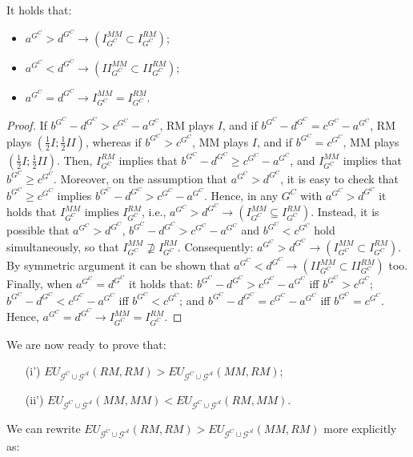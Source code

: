 \documentclass[fleqn,reqno,11pt]{article}
\begin{document}
\medskip{}

\begin{lemma}
It holds that:
\begin{itemize}
\item $a^{G^{C}}>d^{G^{C}}\rightarrow(I_{G^{C}}^{MM}\subset I_{G^{C}}^{RM})$;
\item $a^{G^{C}}<d^{G^{C}}\rightarrow(II_{G^{C}}^{MM}\subset II_{G^{C}}^{RM})$;
\item $a^{G^{C}}=d^{G^{C}}\rightarrow I_{G^{C}}^{MM}=I_{G^{C}}^{RM}$.
\end{itemize}
\end{lemma}

\begin{proof}
If $b^{G^{C}}-d^{G^{C}}>c^{G^{C}}-a^{G^{C}}$, RM plays
$I$, and if $b^{G^{C}}-d^{G^{C}}=c^{G^{C}}-a^{G^{C}}$, RM plays
$(\frac{1}{2}I;\frac{1}{2}II)$, whereas if $b^{G^{C}}>c^{G^{C}}$,
MM plays $I$, and if $b^{G^{C}}=c^{G^{C}}$, MM plays $(\frac{1}{2}I;\frac{1}{2}II)$.
Then, $I_{G^{C}}^{RM}$ implies that $b^{G^{C}}-d^{G^{C}}\geq c^{G^{C}}-a^{G^{C}}$,
and $I_{G^{C}}^{MM}$ implies that $b^{G^{C}}\geq c^{G^{C}}$. Moreover,
on the assumption that $a^{G^{C}}>d^{G^{C}}$, it is easy to check
that $b^{G^{C}}\geq c^{G^{C}}$ implies $b^{G^{C}}-d^{G^{C}}>c^{G^{C}}-a^{G^{C}}$.
Hence, in any $G^{C}$ with $a^{G^{C}}>d^{G^{C}}$ it holds that $I_{G^{C}}^{MM}\mbox{ implies }I_{G^{C}}^{RM}$,
i.e., $a^{G^{C}}>d^{G^{C}}\rightarrow(I_{G^{C}}^{MM}\subseteq I_{G^{C}}^{RM})$.
Instead, it is possible that $a^{G^{C}}>d^{G^{C}}$, $b^{G^{C}}-d^{G^{C}}>c^{G^{C}}-a^{G^{C}}$
and $b^{G^{C}}<c^{G^{C}}$ hold simultaneously, so that $I_{G^{C}}^{MM}\nsupseteq I_{G^{C}}^{RM}$.
Consequently: $a^{G^{C}}>d^{G^{C}}\rightarrow(I_{G^{C}}^{MM}\subset I_{G^{C}}^{RM})$.
By symmetric argument it can be shown that $a^{G^{C}}<d^{G^{C}}\rightarrow(II_{G^{C}}^{MM}\subset II_{G^{C}}^{RM})$
too. \\
Finally, when $a^{G^{C}}=d^{G^{C}}$ it holds that: $b^{G^{C}}-d^{G^{C}}>c^{G^{C}}-a^{G^{C}}$
iff $b^{G^{C}}>c^{G^{C}}$; $b^{G^{C}}-d^{G^{C}}<c^{G^{C}}-a^{G^{C}}$
iff $b^{G^{C}}<c^{G^{C}}$; and $b^{G^{C}}-d^{G^{C}}=c^{G^{C}}-a^{G^{C}}$
iff $b^{G^{C}}=c^{G^{C}}$. Hence, $a^{G^{C}}=d^{G^{C}}\rightarrow I_{G^{C}}^{MM}=I_{G^{C}}^{RM}$.
\end{proof}

\medskip{}


We are now ready to prove that: 
\begin{itemize}
\item[(i')] $EU_{\mathcal{G}^{C}\cup\mathcal{G^{A}}}(RM,RM)>EU_{\mathcal{G}^{C}\cup\mathcal{G^{A}}}(MM,RM);$
\item[(ii')] $EU_{\mathcal{G}^{C}\cup\mathcal{G^{A}}}(MM,MM)<EU_{\mathcal{G}^{C}\cup\mathcal{G^{A}}}(RM,MM).$
\end{itemize}
We can rewrite $EU_{\mathcal{G}^{C}\cup\mathcal{G^{A}}}(RM,RM)>EU_{\mathcal{G}^{C}\cup\mathcal{G^{A}}}(MM,RM)$
more explicitly as:
\end{document}
